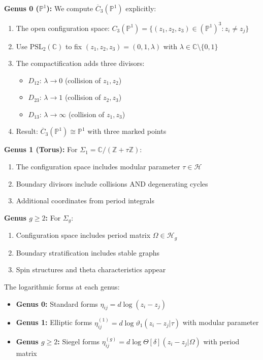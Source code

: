 \begin{example}\label{ex:config-genera}
\textbf{Genus 0 ($\mathbb{P}^1$):} We compute $\overline{C}_3(\mathbb{P}^1)$ explicitly:
\begin{enumerate}
\item The open configuration space: $C_3(\mathbb{P}^1) = \{(z_1, z_2, z_3) \in (\mathbb{P}^1)^3 : z_i \neq z_j\}$

\item Use $\text{PSL}_2(\mathbb{C})$ to fix $(z_1, z_2, z_3) = (0, 1, \lambda)$ with $\lambda \in \mathbb{C} \setminus \{0,1\}$

\item The compactification adds three divisors:
   \begin{itemize}
   \item $D_{12}$: $\lambda \to 0$ (collision of $z_1, z_2$)  
   \item $D_{23}$: $\lambda \to 1$ (collision of $z_2, z_3$)
   \item $D_{13}$: $\lambda \to \infty$ (collision of $z_1, z_3$)
   \end{itemize}

\item Result: $\overline{C}_3(\mathbb{P}^1) \cong \mathbb{P}^1$ with three marked points
\end{enumerate}

\textbf{Genus 1 (Torus):} For $\Sigma_1 = \mathbb{C}/(\mathbb{Z} + \tau\mathbb{Z})$:
\begin{enumerate}
\item The configuration space includes modular parameter $\tau \in \mathcal{H}$
\item Boundary divisors include collisions AND degenerating cycles
\item Additional coordinates from period integrals
\end{enumerate}

\textbf{Genus $g \geq 2$:} For $\Sigma_g$:
\begin{enumerate}
\item Configuration space includes period matrix $\Omega \in \mathcal{H}_g$
\item Boundary stratification includes stable graphs
\item Spin structures and theta characteristics appear
\end{enumerate}

The logarithmic forms at each genus:
\begin{itemize}
\item \textbf{Genus 0:} Standard forms $\eta_{ij} = d\log(z_i - z_j)$
\item \textbf{Genus 1:} Elliptic forms $\eta_{ij}^{(1)} = d\log\vartheta_1(z_i - z_j|\tau)$ with modular parameter
\item \textbf{Genus $g \geq 2$:} Siegel forms $\eta_{ij}^{(g)} = d\log\Theta[\delta](z_i - z_j|\Omega)$ with period matrix
\end{itemize}


\end{example}
